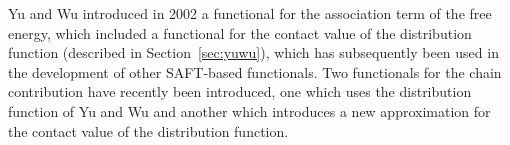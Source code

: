 Yu and Wu introduced in 2002 a functional for the association term of
the free energy, which included a functional for the contact value of
the distribution function (described in
Section~\ref{sec:yuwu})\cite{yu2002fmt-dft-inhomogeneous-associating},
which has subsequently been used in the development of other
SAFT-based functionals\cite{fu2005vapor-liquid-dft, bryk2006density}.
Two functionals for the chain contribution have recently been
introduced, one which uses the
distribution function of Yu and Wu\cite{bryk2006density} and another which
introduces a new approximation for the contact value of the
distribution function\cite{gross2009density}.

